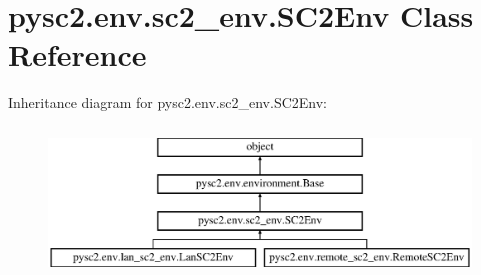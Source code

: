 \hypertarget{classpysc2_1_1env_1_1sc2__env_1_1_s_c2_env}{}\section{pysc2.\+env.\+sc2\+\_\+env.\+S\+C2\+Env Class Reference}
\label{classpysc2_1_1env_1_1sc2__env_1_1_s_c2_env}
Inheritance diagram for pysc2.\+env.\+sc2\+\_\+env.\+S\+C2\+Env\+:\begin{figure}[H]
\begin{center}
\leavevmode
\includegraphics[height=4.000000cm]{classpysc2_1_1env_1_1sc2__env_1_1_s_c2_env}
\end{center}
\end{figure}
